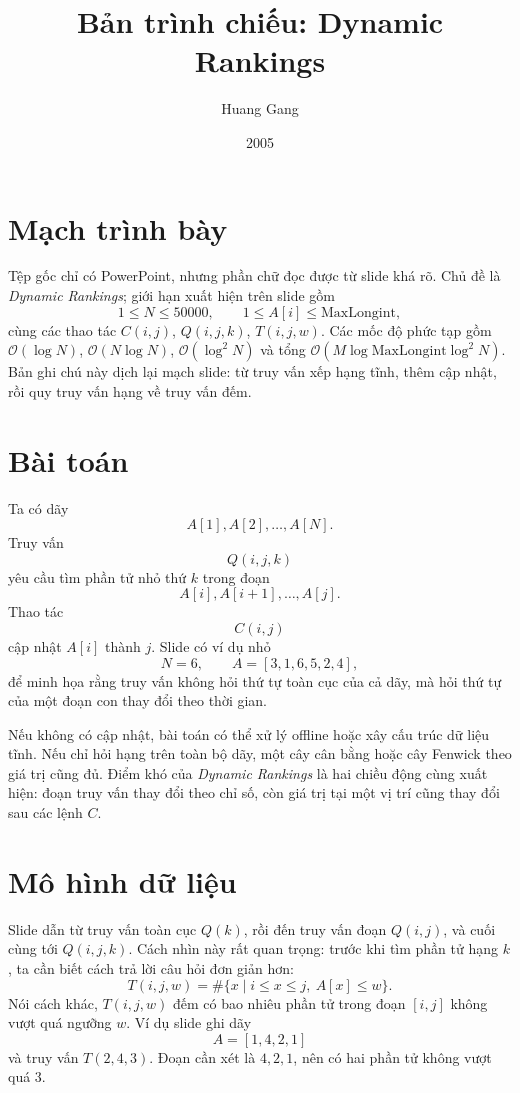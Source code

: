 \documentclass[11pt]{article}
\title{Bản trình chiếu: Dynamic Rankings}
\author{Huang Gang}
\date{2005}
\newcommand{\Oh}{\mathcal{O}}
\begin{document}
\maketitle


\section{Mạch trình bày}

Tệp gốc chỉ có PowerPoint, nhưng phần chữ đọc được từ slide khá rõ. Chủ đề là
\textit{Dynamic Rankings}; giới hạn xuất hiện trên slide gồm
\[
  1\le N\le 50000,\qquad 1\le A[i]\le \mathrm{MaxLongint},
\]
cùng các thao tác \(C(i,j)\), \(Q(i,j,k)\), \(T(i,j,w)\). Các mốc độ phức
tạp gồm \(\Oh(\log N)\), \(\Oh(N\log N)\), \(\Oh(\log^2 N)\) và tổng
\(\Oh(M\log\mathrm{MaxLongint}\log^2 N)\). Bản ghi chú này dịch lại mạch
slide: từ truy vấn xếp hạng tĩnh, thêm cập nhật, rồi quy truy vấn hạng về
truy vấn đếm.

\section{Bài toán}

Ta có dãy
\[
  A[1],A[2],\ldots,A[N].
\]
Truy vấn
\[
  Q(i,j,k)
\]
yêu cầu tìm phần tử nhỏ thứ \(k\) trong đoạn
\[
  A[i],A[i+1],\ldots,A[j].
\]
Thao tác
\[
  C(i,j)
\]
cập nhật \(A[i]\) thành \(j\). Slide có ví dụ nhỏ
\[
  N=6,\qquad A=[3,1,6,5,2,4],
\]
để minh họa rằng truy vấn không hỏi thứ tự toàn cục của cả dãy, mà hỏi thứ tự
của một đoạn con thay đổi theo thời gian.

Nếu không có cập nhật, bài toán có thể xử lý offline hoặc xây cấu trúc dữ liệu
tĩnh. Nếu chỉ hỏi hạng trên toàn bộ dãy, một cây cân bằng hoặc cây Fenwick
theo giá trị cũng đủ. Điểm khó của \textit{Dynamic Rankings} là hai chiều động
cùng xuất hiện: đoạn truy vấn thay đổi theo chỉ số, còn giá trị tại một vị trí
cũng thay đổi sau các lệnh \(C\).

\section{Mô hình dữ liệu}

Slide dẫn từ truy vấn toàn cục \(Q(k)\), rồi đến truy vấn đoạn \(Q(i,j)\), và
cuối cùng tới \(Q(i,j,k)\). Cách nhìn này rất quan trọng: trước khi tìm phần
tử hạng \(k\), ta cần biết cách trả lời câu hỏi đơn giản hơn:
\[
  T(i,j,w)=\#\{x\mid i\le x\le j,\ A[x]\le w\}.
\]
Nói cách khác, \(T(i,j,w)\) đếm có bao nhiêu phần tử trong đoạn \([i,j]\)
không vượt quá ngưỡng \(w\). Ví dụ slide ghi dãy
\[
  A=[1,4,2,1]
\]
và truy vấn \(T(2,4,3)\). Đoạn cần xét là \(4,2,1\), nên có hai phần tử không
vượt quá \(3\).
\end{document}
